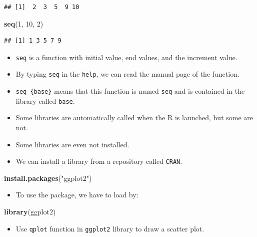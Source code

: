 \documentclass[]{book}
\newenvironment{Shaded}{\begin{snugshade}}{\end{snugshade}}
\newcommand{\KeywordTok}[1]{\textcolor[rgb]{0.13,0.29,0.53}{\textbf{#1}}}
\newcommand{\DecValTok}[1]{\textcolor[rgb]{0.00,0.00,0.81}{#1}}
\newcommand{\StringTok}[1]{\textcolor[rgb]{0.31,0.60,0.02}{#1}}
\newcommand{\NormalTok}[1]{#1}
\providecommand{\tightlist}{%
  \setlength{\itemsep}{0pt}\setlength{\parskip}{0pt}}
\begin{document}
\begin{verbatim}
## [1]  2  3  5  9 10
\end{verbatim}

\begin{Shaded}
\begin{Highlighting}[]
\KeywordTok{seq}\NormalTok{(}\DecValTok{1}\NormalTok{, }\DecValTok{10}\NormalTok{, }\DecValTok{2}\NormalTok{)}
\end{Highlighting}
\end{Shaded}

\begin{verbatim}
## [1] 1 3 5 7 9
\end{verbatim}

\begin{itemize}
\tightlist
\item
  \texttt{seq} is a function with initial value, end values, and the
  increment value.
\item
  By typing \texttt{seq} in the \texttt{help}, we can read the manual
  page of the function.
\item
  \texttt{seq\ \{base\}} means that this function is named \texttt{seq}
  and is contained in the library called \texttt{base}.
\item
  Some libraries are automatically called when the R is launched, but
  some are not.
\item
  Some libraries are even not installed.
\item
  We can install a library from a repository called \texttt{CRAN}.
\end{itemize}

\begin{Shaded}
\begin{Highlighting}[]
\KeywordTok{install.packages}\NormalTok{(}\StringTok{"ggplot2"}\NormalTok{)}
\end{Highlighting}
\end{Shaded}

\begin{itemize}
\tightlist
\item
  To use the package, we have to load by:
\end{itemize}

\begin{Shaded}
\begin{Highlighting}[]
\KeywordTok{library}\NormalTok{(ggplot2)}
\end{Highlighting}
\end{Shaded}

\begin{itemize}
\tightlist
\item
  Use \texttt{qplot} function in \texttt{ggplot2} library to draw a
  scatter plot.
\end{itemize}
\end{document}
